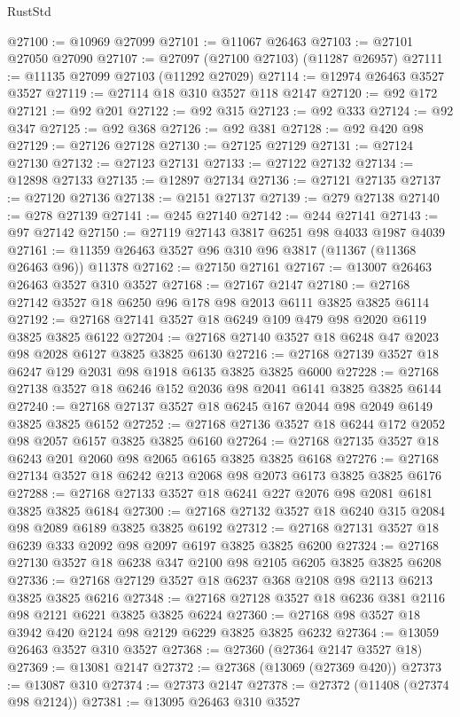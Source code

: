 \begin{lexlean}{RustStd}
\begin{coremodule}
@27100 := @10969 @27099
@27101 := @11067 @26463
@27103 := @27101 @27050 @27090
@27107 := @27097 (@27100 @27103) (@11287 @26957)
@27111 := @11135 @27099 @27103 (@11292 @27029)
@27114 := @12974 @26463 @3527 @3527
@27119 := @27114 @18 @310 @3527 @118 @2147
@27120 := @92 @172
@27121 := @92 @201
@27122 := @92 @315
@27123 := @92 @333
@27124 := @92 @347
@27125 := @92 @368
@27126 := @92 @381
@27128 := @92 @420 @98
@27129 := @27126 @27128
@27130 := @27125 @27129
@27131 := @27124 @27130
@27132 := @27123 @27131
@27133 := @27122 @27132
@27134 := @12898 @27133
@27135 := @12897 @27134
@27136 := @27121 @27135
@27137 := @27120 @27136
@27138 := @2151 @27137
@27139 := @279 @27138
@27140 := @278 @27139
@27141 := @245 @27140
@27142 := @244 @27141
@27143 := @97 @27142
@27150 := @27119 @27143 @3817 @6251 @98 @4033 @1987 @4039
@27161 := @11359 @26463 @3527 @96 @310 @96 @3817 (@11367 (@11368 @26463 @96)) @11378
@27162 := @27150 @27161
@27167 := @13007 @26463 @26463 @3527 @310 @3527
@27168 := @27167 @2147
@27180 := @27168 @27142 @3527 @18 @6250 @96 @178 @98 @2013 @6111 @3825 @3825 @6114
@27192 := @27168 @27141 @3527 @18 @6249 @109 @479 @98 @2020 @6119 @3825 @3825 @6122
@27204 := @27168 @27140 @3527 @18 @6248 @47 @2023 @98 @2028 @6127 @3825 @3825 @6130
@27216 := @27168 @27139 @3527 @18 @6247 @129 @2031 @98 @1918 @6135 @3825 @3825 @6000
@27228 := @27168 @27138 @3527 @18 @6246 @152 @2036 @98 @2041 @6141 @3825 @3825 @6144
@27240 := @27168 @27137 @3527 @18 @6245 @167 @2044 @98 @2049 @6149 @3825 @3825 @6152
@27252 := @27168 @27136 @3527 @18 @6244 @172 @2052 @98 @2057 @6157 @3825 @3825 @6160
@27264 := @27168 @27135 @3527 @18 @6243 @201 @2060 @98 @2065 @6165 @3825 @3825 @6168
@27276 := @27168 @27134 @3527 @18 @6242 @213 @2068 @98 @2073 @6173 @3825 @3825 @6176
@27288 := @27168 @27133 @3527 @18 @6241 @227 @2076 @98 @2081 @6181 @3825 @3825 @6184
@27300 := @27168 @27132 @3527 @18 @6240 @315 @2084 @98 @2089 @6189 @3825 @3825 @6192
@27312 := @27168 @27131 @3527 @18 @6239 @333 @2092 @98 @2097 @6197 @3825 @3825 @6200
@27324 := @27168 @27130 @3527 @18 @6238 @347 @2100 @98 @2105 @6205 @3825 @3825 @6208
@27336 := @27168 @27129 @3527 @18 @6237 @368 @2108 @98 @2113 @6213 @3825 @3825 @6216
@27348 := @27168 @27128 @3527 @18 @6236 @381 @2116 @98 @2121 @6221 @3825 @3825 @6224
@27360 := @27168 @98 @3527 @18 @3942 @420 @2124 @98 @2129 @6229 @3825 @3825 @6232
@27364 := @13059 @26463 @3527 @310 @3527
@27368 := @27360 (@27364 @2147 @3527 @18)
@27369 := @13081 @2147
@27372 := @27368 (@13069 (@27369 @420))
@27373 := @13087 @310
@27374 := @27373 @2147
@27378 := @27372 (@11408 (@27374 @98 @2124))
@27381 := @13095 @26463 @310 @3527

\end{coremodule}
\end{lexlean}
